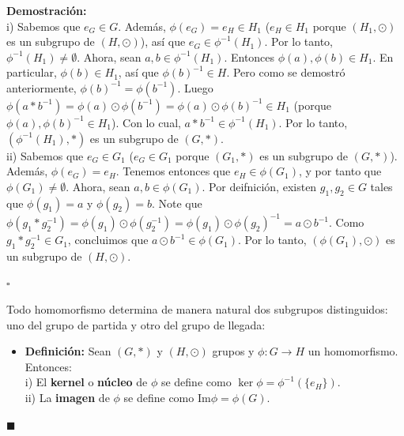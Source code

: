 \documentclass[10 pt]{article}
\begin{document}
\Large{\textbf{Demostración:} \\

i) Sabemos que $e_G \in G$. Además, $\phi(e_G)=e_H \in H_1$ ($e_H \in H_1$ porque $(H_1,\odot)$ es un subgrupo de $(H,\odot)$), así que $e_G \in \phi^{-1}(H_1)$. Por lo tanto, $\phi^{-1}(H_1) \neq \emptyset$. Ahora, sean $a,b \in \phi^{-1}(H_1)$. Entonces $\phi(a),\phi(b) \in H_1$. En particular, $\phi(b) \in H_1$, así que $\phi(b)^{-1} \in H$. Pero como se demostró anteriormente, $\phi(b)^{-1}=\phi(b^{-1})$. Luego $\phi(a*b^{-1})=\phi(a)\odot\phi(b^{-1})=\phi(a) \odot \phi(b)^{-1} \in H_1$ (porque $\phi(a),\phi(b)^{-1} \in H_1$). Con lo cual, $a*b^{-1}  \in \phi^{-1}(H_1)$. Por lo tanto, $(\phi^{-1}(H_1),*)$ es un subgrupo de $(G,*)$. \\

ii) Sabemos que $e_G \in G_1$ ($e_G \in G_1$ porque $(G_1,*)$ es un subgrupo de $(G,*)$). Además, $\phi(e_G)=e_H$. Tenemos entonces que $e_H \in \phi(G_1)$, y por tanto que $\phi(G_1) \neq \emptyset$. Ahora, sean $a,b \in \phi(G_1)$. Por deifnición, existen $g_1,g_2 \in G$ tales que $\phi(g_1)=a$ y $\phi(g_2)=b$. Note que $\phi(g_1*g_2^{-1})=\phi(g_1) \odot \phi(g_2^{-1})=\phi(g_1) \odot \phi(g_2)^{-1}=a \odot b^{-1}$. Como $g_1*g_2^{-1} \in G_1$, concluimos que $a \odot b^{-1} \in \phi(G_1)$. Por lo tanto, $(\phi(G_1),\odot)$ es un subgrupo de $(H,\odot)$.} \\

\begin{flushright}
    $\square$
\end{flushright}

\Large{Todo homomorfismo determina de manera natural dos subgrupos distinguidos: uno del grupo de partida y otro del grupo de llegada:} \\

\begin{itemize}
    \item \Large{\textbf{Definición:} Sean $(G,*)$ y $(H,\odot)$ grupos y $\phi:G \rightarrow H$ un homomorfismo. Entonces: \\

    i) El \textbf{kernel} o \textbf{núcleo} de $\phi$ se define como $\ker \phi=\phi^{-1}(\{e_H\})$. \\

    ii) La \textbf{imagen} de $\phi$ se define como $\text{Im} \phi=\phi(G)$.} \\
\end{itemize}

\begin{flushright}
    $\blacksquare$
\end{flushright}
\end{document}
